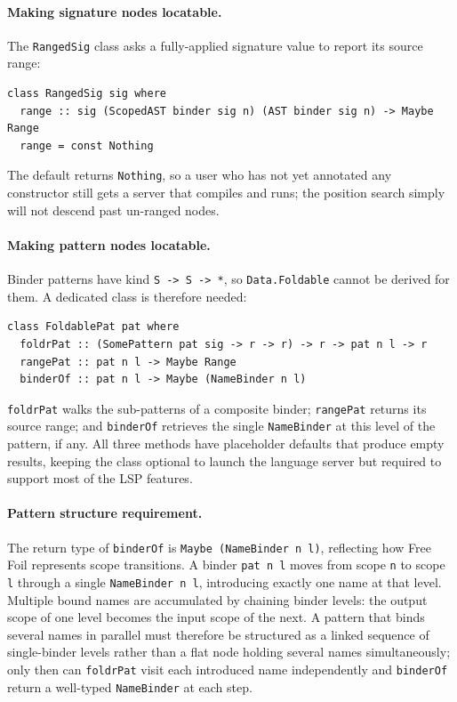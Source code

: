 \paragraph{Making signature nodes locatable.}
The \texttt{RangedSig} class asks a fully-applied signature value to report its source range:

\begin{verbatim}
class RangedSig sig where
  range :: sig (ScopedAST binder sig n) (AST binder sig n) -> Maybe Range
  range = const Nothing
\end{verbatim}

The default returns \texttt{Nothing}, so a user who has not yet annotated any constructor still gets a server that compiles and runs; the position search simply will not descend past un-ranged nodes.

\paragraph{Making pattern nodes locatable.}
Binder patterns have kind \texttt{S -> S -> *}, so \texttt{Data.Foldable} cannot be derived for them.
A dedicated class is therefore needed:

\begin{verbatim}
class FoldablePat pat where
  foldrPat :: (SomePattern pat sig -> r -> r) -> r -> pat n l -> r
  rangePat :: pat n l -> Maybe Range
  binderOf :: pat n l -> Maybe (NameBinder n l)
\end{verbatim}

\texttt{foldrPat} walks the sub-patterns of a composite binder; \texttt{rangePat} returns its source range; and \texttt{binderOf} retrieves the single \texttt{NameBinder} at this level of the pattern, if any.
All three methods have placeholder defaults that produce empty results, keeping the class optional to launch the language server but required to support most of the LSP features.

\paragraph{Pattern structure requirement.}
The return type of \texttt{binderOf} is \texttt{Maybe (NameBinder n l)}, reflecting how Free Foil represents scope transitions.
A binder \texttt{pat n l} moves from scope \texttt{n} to scope \texttt{l} through a single \texttt{NameBinder n l}, introducing exactly one name at that level.
Multiple bound names are accumulated by chaining binder levels: the output scope of one level becomes the input scope of the next.
A pattern that binds several names in parallel must therefore be structured as a linked sequence of single-binder levels rather than a flat node holding several names simultaneously; only then can \texttt{foldrPat} visit each introduced name independently and \texttt{binderOf} return a well-typed \texttt{NameBinder} at each step.

